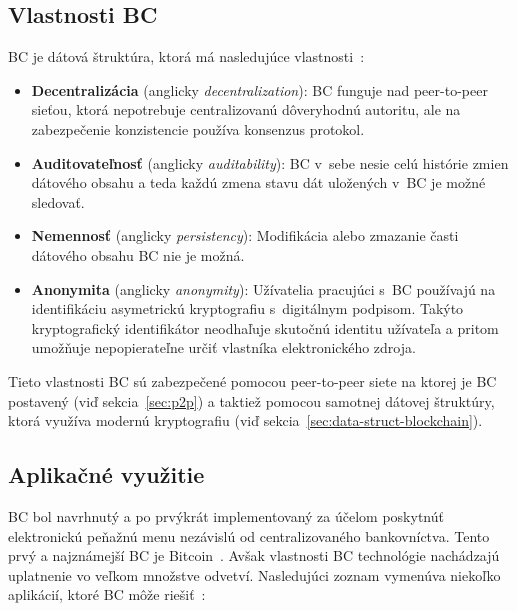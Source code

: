 \subsection{Vlastnosti BC}
BC je dátová štruktúra, ktorá má nasledujúce vlastnosti~\cite{zhengBlockchainOverview}:
\begin{itemize}
	\item \textbf{Decentralizácia} (anglicky \textit{decentralization}): BC funguje nad peer-to-peer sieťou, ktorá nepotrebuje centralizovanú dôveryhodnú autoritu, ale na zabezpečenie konzistencie používa konsenzus protokol.
	\item \textbf{Auditovateľnosť} (anglicky \textit{auditability}): BC v~sebe nesie celú histórie zmien dátového obsahu a teda každú zmena stavu dát uložených v~BC je možné sledovať.
	\item \textbf{Nemennosť} (anglicky \textit{persistency}): Modifikácia alebo zmazanie časti dátového obsahu BC nie je možná.
	\item \textbf{Anonymita} (anglicky \textit{anonymity}): Užívatelia pracujúci s~BC používajú na identifikáciu asymetrickú kryptografiu s~digitálnym podpisom. Takýto kryptografický identifikátor neodhaľuje skutočnú identitu užívateľa a pritom umožňuje nepopierateľne určiť vlastníka elektronického zdroja.
\end{itemize}

Tieto vlastnosti BC sú zabezpečené pomocou peer-to-peer siete na ktorej je BC postavený (viď sekcia~\ref{sec:p2p}) a taktiež pomocou samotnej dátovej štruktúry, ktorá využíva modernú kryptografiu (viď sekcia~\ref{sec:data-struct-blockchain}).~\cite{horizenAcademy}

\subsection{Aplikačné využitie}

BC bol navrhnutý a po prvýkrát implementovaný za účelom poskytnúť elektronickú peňažnú menu nezávislú od centralizovaného bankovníctva. Tento prvý a najznámejší BC je Bitcoin~\cite{satoshiBitcoin}. Avšak vlastnosti BC technológie nachádzajú uplatnenie vo veľkom množstve odvetví. Nasledujúci zoznam vymenúva niekoľko aplikácií, ktoré BC môže riešiť~\cite{homoliakBlockchain}:

